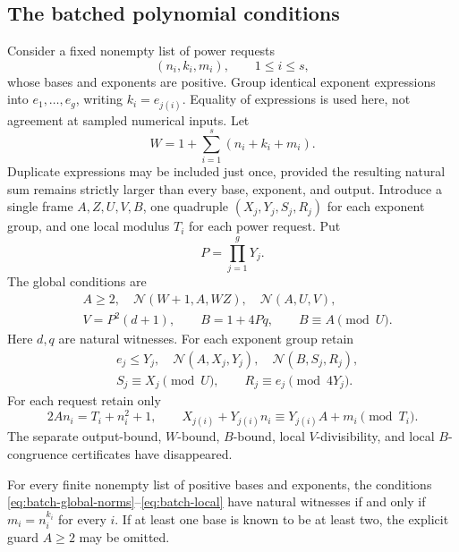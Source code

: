\subsection{The batched polynomial conditions}

Consider a fixed nonempty list of power requests
\[
 (n_i,k_i,m_i),\qquad 1\leq i\leq s,
\]
whose bases and exponents are positive. Group identical exponent
expressions into $e_1,\ldots,e_g$, writing $k_i=e_{j(i)}$. Equality of
expressions is used here, not agreement at sampled numerical inputs.
Let
\[
 W=1+\sum_{i=1}^s(n_i+k_i+m_i).
 \label{eq:shared-W}
\]
Duplicate expressions may be included just once, provided the resulting
natural sum remains strictly larger than every base, exponent, and output.
Introduce a single frame $A,Z,U,V,B$, one quadruple
$(X_j,Y_j,S_j,R_j)$ for each exponent group, and one local modulus $T_i$
for each power request. Put
\[
 P=\prod_{j=1}^gY_j.
\]
The global conditions are
\begin{align}
 &A\geq2,\quad \mathcal N(W+1,A,WZ),\quad
   \mathcal N(A,U,V),\label{eq:batch-global-norms}\\
 &V=P^2(d+1),\qquad B=1+4Pq,
   \qquad B\equiv A\pmod U.\label{eq:batch-pooled}
\end{align}
Here $d,q$ are natural witnesses. For each exponent group retain
\begin{align}
 &e_j\leq Y_j,\quad \mathcal N(A,X_j,Y_j),\quad
     \mathcal N(B,S_j,R_j),\label{eq:batch-group-norms}\\
 &S_j\equiv X_j\pmod U,
       \qquad R_j\equiv e_j\pmod{4Y_j}.\label{eq:batch-group-congruences}
\end{align}
For each request retain only
\begin{equation}
 2An_i=T_i+n_i^2+1,\qquad
 X_{j(i)}+Y_{j(i)}n_i
      \equiv Y_{j(i)}A+m_i\pmod{T_i}.
 \label{eq:batch-local}
\end{equation}
The separate output-bound, $W$-bound, $B$-bound, local $V$-divisibility,
and local $B$-congruence certificates have disappeared.

\begin{theorem}
\label{thm:simultaneous-powers}
For every finite nonempty list of positive bases and exponents, the
conditions \eqref{eq:batch-global-norms}--\eqref{eq:batch-local} have
natural witnesses if and only if $m_i=n_i^{k_i}$ for every $i$.
If at least one base is known to be at least two, the explicit guard
$A\geq2$ may be omitted.
\end{theorem}

